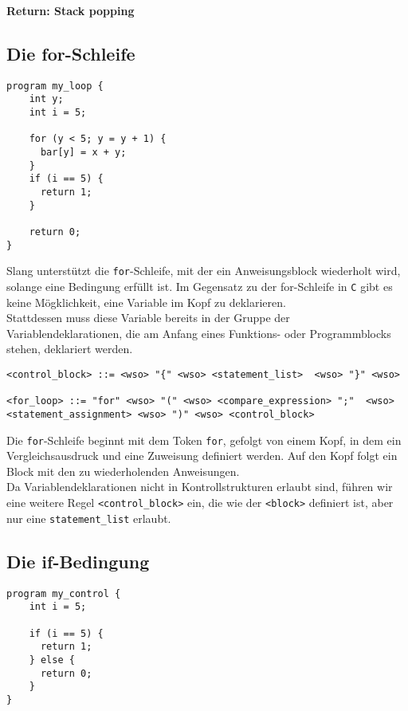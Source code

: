 \textbf{Return: Stack popping}\\

\subsection{Die for-Schleife}

\begin{lstlisting}
program my_loop {
    int y;
    int i = 5;
    
    for (y < 5; y = y + 1) {
      bar[y] = x + y;
    }
    if (i == 5) {
      return 1;
    }

    return 0;
}
\end{lstlisting}

Slang unterstützt die \texttt{for}-Schleife, mit der ein Anweisungsblock wiederholt wird, solange eine Bedingung erfüllt ist.
Im Gegensatz zu der for-Schleife in \texttt{C} gibt es keine Mögklichkeit, eine Variable im Kopf zu deklarieren.\\
Stattdessen muss diese Variable bereits in der Gruppe der Variablendeklarationen, die am Anfang eines Funktions- oder Programmblocks stehen, deklariert werden.\\

\begin{lstlisting}
<control_block> ::= <wso> "{" <wso> <statement_list>  <wso> "}" <wso>

<for_loop> ::= "for" <wso> "(" <wso> <compare_expression> ";"  <wso> <statement_assignment> <wso> ")" <wso> <control_block>
\end{lstlisting}

Die \texttt{for}-Schleife beginnt mit dem Token \texttt{for}, gefolgt von einem Kopf, in dem ein Vergleichsausdruck und eine Zuweisung definiert werden.
Auf den Kopf folgt ein Block mit den zu wiederholenden Anweisungen.\\

Da Variablendeklarationen nicht in Kontrollstrukturen erlaubt sind, führen wir eine weitere Regel \texttt{<control\_block>} ein, die wie der \texttt{<block>} definiert ist, aber nur eine \texttt{statement\_list} erlaubt.

\subsection{Die if-Bedingung}

\begin{lstlisting}
program my_control {
    int i = 5;
    
    if (i == 5) {
      return 1;
    } else {
      return 0;
    }
}
\end{lstlisting}

